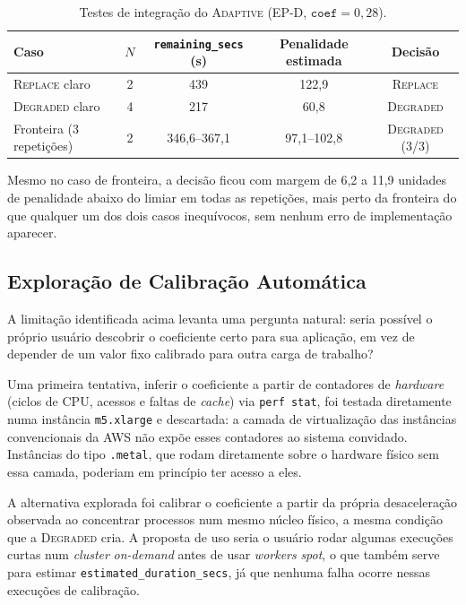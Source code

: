 \begin{table}[htb]
  \caption{Testes de integração do \textsc{Adaptive} (EP-D, $\texttt{coef}=0,28$).}
  \label{tab:adaptive-integracao}
  \centering
  \small
  \begin{tabular}{l c c c c}
    \toprule
    Caso & $N$ & \texttt{remaining\_secs} (s) & Penalidade estimada & Decisão \\
    \midrule
    \textsc{Replace} claro      & 2 & 439             & 122,9       & \textsc{Replace} \\
    \textsc{Degraded} claro     & 4 & 217              & 60,8        & \textsc{Degraded} \\
    Fronteira (3 repetições)    & 2 & 346,6--367,1     & 97,1--102,8 & \textsc{Degraded} (3/3) \\
    \bottomrule
  \end{tabular}
\end{table}

Mesmo no caso de fronteira, a decisão ficou com margem de 6,2 a 11,9 unidades de
penalidade abaixo do limiar em todas as repetições, mais perto da fronteira do que
qualquer um dos dois casos inequívocos, sem nenhum erro de implementação aparecer.

\subsection{Exploração de Calibração Automática}
\label{sec:adaptive-calibracao-automatica}

A limitação identificada acima levanta uma pergunta natural: seria possível o
próprio usuário descobrir o coeficiente certo para sua aplicação, em vez de
depender de um valor fixo calibrado para outra carga de trabalho?

Uma primeira tentativa, inferir o coeficiente a partir de contadores de
\textit{hardware} (ciclos de CPU, acessos e faltas de \textit{cache}) via
\texttt{perf stat}, foi testada diretamente numa instância \texttt{m5.xlarge} e
descartada: a camada de virtualização das instâncias convencionais da AWS não
expõe esses contadores ao sistema convidado. Instâncias do tipo \texttt{.metal},
que rodam diretamente sobre o hardware físico sem essa camada, poderiam em
princípio ter acesso a eles.

A alternativa explorada foi calibrar o coeficiente a partir da própria
desaceleração observada ao concentrar processos num mesmo núcleo físico, a mesma
condição que a \textsc{Degraded} cria. A proposta de uso seria o usuário rodar
algumas execuções curtas num \textit{cluster} \textit{on-demand} antes de usar
\textit{workers} \textit{spot}, o que também serve para estimar
\texttt{estimated\_duration\_secs}, já que nenhuma falha ocorre nessas execuções
de calibração.

